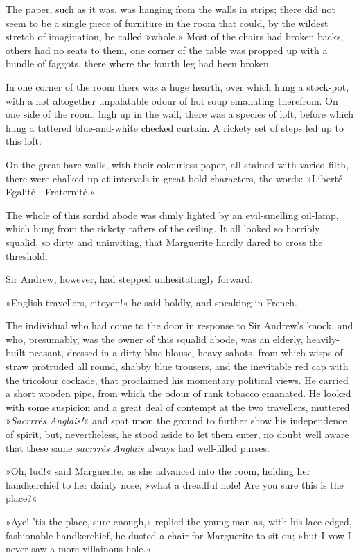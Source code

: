 The paper, such as it was, was hanging from the walls in strips; there did not seem to be a single piece of furniture in the room that could, by the wildest stretch of imagination, be called »whole.« Most of the chairs had broken backs, others had no seats to them, one corner of the table was propped up with a bundle of faggots, there where the fourth leg had been broken.

In one corner of the room there was a huge hearth, over which hung a stock-pot, with a not altogether unpalatable odour of hot soup emanating therefrom. On one side of the room, high up in the wall, there was a species of loft, before which hung a tattered blue-and-white checked curtain. A rickety set of steps led up to this loft.

On the great bare walls, with their colourless paper, all stained with varied filth, there were chalked up at intervals in great bold characters, the words: »Liberté—Egalité—Fraternité.«

The whole of this sordid abode was dimly lighted by an evil-smelling oil-lamp, which hung from the rickety rafters of the ceiling. It all looked so horribly squalid, so dirty and uninviting, that Marguerite hardly dared to cross the threshold.

Sir Andrew, however, had stepped unhesitatingly forward.

»English travellers, citoyen!« he said boldly, and speaking in French.

The individual who had come to the door in response to Sir Andrew's knock, and who, presumably, was the owner of this squalid abode, was an elderly, heavily-built peasant, dressed in a dirty blue blouse, heavy sabots, from which wisps of straw protruded all round, shabby blue trousers, and the inevitable red cap with the tricolour cockade, that proclaimed his momentary political views. He carried a short wooden pipe, from which the odour of rank tobacco emanated. He looked with some suspicion and a great deal of contempt at the two travellers, muttered »\textit{Sacrrrés Anglais!}« and spat upon the ground to further show his independence of spirit, but, nevertheless, he stood aside to let them enter, no doubt well aware that these same \textit{sacrrrés Anglais} always had well-filled purses.

»Oh, lud!« said Marguerite, as she advanced into the room, holding her handkerchief to her dainty nose, »what a dreadful hole! Are you sure this is the place?«

»Aye! 'tis the place, sure enough,« replied the young man as, with his lace-edged, fashionable handkerchief, he dusted a chair for Marguerite to sit on; »but I vow I never saw a more villainous hole.«

